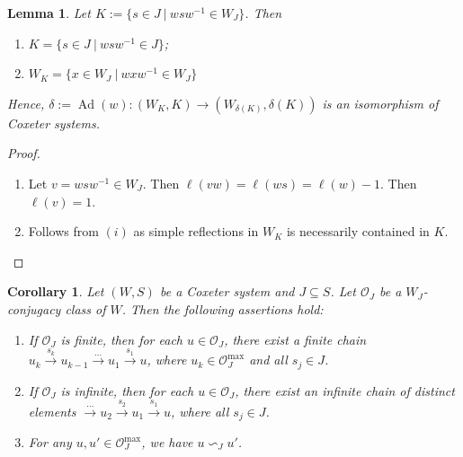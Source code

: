 \documentclass[a4paper, reqno, 14pt]{amsart}
\def\d{\delta}
\def\i{{^{-1}}}
\def\subset{\subseteq}
\def\co{\mathcal{O}}
\DeclareMathOperator{\Ad}{Ad}
\newtheorem{lem}[thm]{Lemma}
\newtheorem{cor}[thm]{Corollary}
\theoremstyle{definition}
\theoremstyle{remark}
\numberwithin{equation}{section}
\numberwithin{thm}{section}
\begin{document}
    \begin{lem} Let $K:=\{s\in J\ |\ wsw\i\in W_J \}$. Then \label{lem:maxWK}
    \begin{enumerate}
        \item $K=\{s\in J\ |\ wsw\i\in J \}$;
        \item $W_K=\{x\in W_J\ |\ wxw\i\in W_J \}$
    \end{enumerate}
    Hence, $\d:=\Ad(w):(W_K,K)\to (W_{\d(K)},\d(K))$ is an isomorphism of Coxeter systems.
    \end{lem}
    \begin{proof}
        \begin{enumerate}
            \item Let $v=wsw\i\in W_J$. Then $\ell(vw)=\ell(ws)=\ell(w)-1$. Then $\ell(v)=1$.
            \item Follows from $(i)$ as simple reflections in $W_K$ is necessarily contained in $K$.
        \end{enumerate}
    \end{proof}

    
    \begin{cor}\label{cor:maximalthm}
    Let $(W,S)$ be a Coxeter system and $J\subset S$. Let $\co_{J}$ be a $W_J$-conjugacy class of $W$. Then the following assertions hold:
            \begin{enumerate}
                 \item If $\co_{J}$ is finite, then for each $u \in \co_{J}$, there exist a finite chain $u_k\xrightarrow{s_k}u_{k-1}\xrightarrow{\dots}u_1\xrightarrow{s_1}u$, where $u_k \in \co^{\max}_J$ and all $s_j\in J$.
                 \item If $\co_{J}$ is infinite, then for each $u \in \co_{J}$, there exist an infinite chain of distinct elements $\xrightarrow{\dots}u_2\xrightarrow{s_2}u_1\xrightarrow{s_1}u$, where all $s_j\in J$.
            
                \item For any $u, u' \in \co^{\max}_{J}$, we have $u \backsim_{J} u'$.
            \end{enumerate}
        \end{cor}
\end{document}
